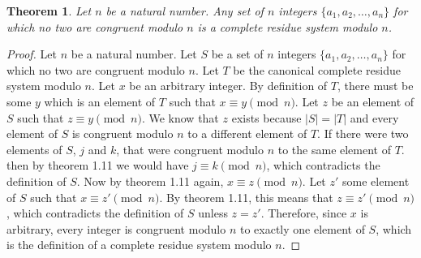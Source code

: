 \documentclass[12pt,leqno]{article}
\numberwithin{equation}{section}
\newtheorem{thm}{Theorem}[section]
\theoremstyle{definition}
\newcommand{\card}[1]{\left| #1 \right|}
\begin{document}
\pagebreak
\begin{thm}
Let $n$ be a natural number. Any set of $n$ integers $\{a_1, a_2,
\hdots, a_n\}$ for which no two are congruent modulo $n$ is a
complete residue system modulo $n$.
\end{thm}

\begin{proof}[Proof]
Let $n$ be a natural number. Let $S$ be a set of $n$ integers $\{a_1, a_2, \hdots, a_n\}$ for which no two are congruent modulo $n$.  Let $T$ be the canonical complete residue system modulo $n$.  Let $x$ be an arbitrary integer.  By definition of $T$, there must be some $y$ which is an element of $T$ such that $x \equiv y \pmod{n}$.  Let $z$ be an element of $S$ such that $z \equiv y \pmod{n}$.  We know that $z$ exists because $\card{S} = \card{T}$ and every element of $S$ is congruent modulo $n$ to a different element of $T$. If there were two elements of $S$, $j$ and $k$, that were congruent modulo $n$ to the same element of $T$. then by theorem 1.11 we would have $j \equiv k \pmod{n}$, which contradicts the definition of $S$. Now by theorem 1.11 again, $x \equiv z \pmod{n}$.  Let $z'$ some element of $S$ such that $x \equiv z' \pmod{n}$.  By theorem 1.11, this means that $z \equiv z' \pmod{n}$, which contradicts the definition of $S$ unless $z = z'$.  Therefore, since $x$ is arbitrary, every integer is congruent modulo $n$ to exactly one element of $S$, which is the definition of a complete residue system modulo $n$.
\end{proof}
\end{document}
